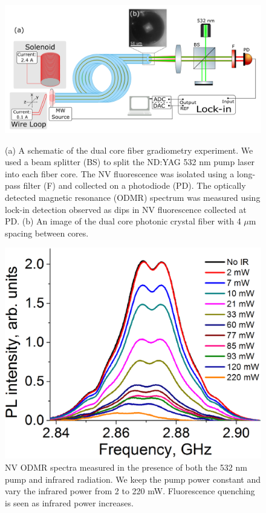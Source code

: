 \documentclass[12 pt]{article}
\begin{document}
\begin{figure}
    \centering
    \begin{minipage}{0.6\textwidth}
    \includegraphics[width = 1.0\textwidth]{Images/DualCore.png}
    \caption{(a) A schematic of the dual core fiber gradiometry experiment. We used a beam splitter (BS) to split 
    the ND:YAG 532 nm pump laser into each fiber core. The NV fluorescence was isolated using a long-pass filter (F) 
    and collected on a photodiode (PD). The optically detected magnetic resonance (ODMR) spectrum was measured using
lock-in detection observed as dips in NV fluorescence collected at PD. (b) An image of the dual core photonic crystal fiber with 4 $\mu$m spacing between cores.}
    \label{fig:DualCore}
    \end{minipage}
    \qquad
    \begin{minipage}{0.3\textwidth}
    \includegraphics[width = 1.0\textwidth]{Images/FluorQuen.jpg}
    \caption{NV ODMR spectra measured in the presence of both the 532 nm pump and infrared radiation. We keep the 
    pump power constant and vary the infrared power from 2 to 220 mW. Fluorescence quenching is seen as infrared
    power increases.}
    \label{fig:FluorQuen}
    \end{minipage}
\end{figure}
\end{document}
